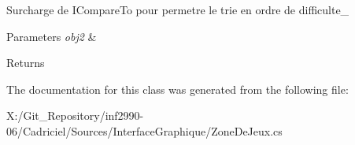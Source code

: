 Surcharge de I\-Compare\-To pour permetre le trie en ordre de difficulte\-\_\- 


\begin{DoxyParams}{Parameters}
{\em obj2} & \\
\hline
\end{DoxyParams}
\begin{DoxyReturn}{Returns}

\end{DoxyReturn}


The documentation for this class was generated from the following file\-:\begin{DoxyCompactItemize}
\item 
X\-:/\-Git\-\_\-\-Repository/inf2990-\/06/\-Cadriciel/\-Sources/\-Interface\-Graphique/Zone\-De\-Jeux.\-cs\end{DoxyCompactItemize}
